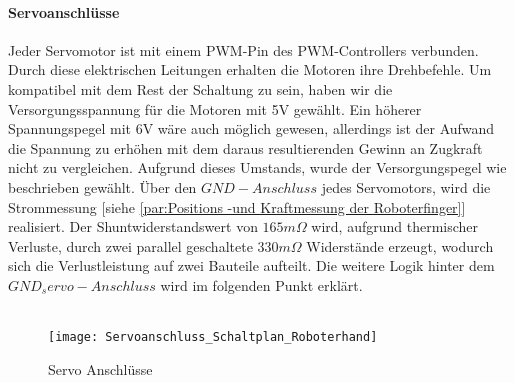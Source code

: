 \documentclass[titlepage,12pt,twoside]{article}
\begin{document}
\paragraph{Servoanschlüsse}
\hfill \break
\hfill \break
Jeder Servomotor ist mit einem PWM-Pin des PWM-Controllers verbunden. Durch diese elektrischen Leitungen erhalten die Motoren ihre Drehbefehle. Um kompatibel mit dem Rest der Schaltung zu sein, haben wir die Versorgungsspannung für die Motoren mit
5V gewählt. Ein höherer Spannungspegel mit 6V wäre auch möglich gewesen, allerdings ist der Aufwand die Spannung zu erhöhen mit dem daraus resultierenden Gewinn an Zugkraft nicht zu vergleichen. Aufgrund dieses Umstands, wurde der Versorgungspegel
wie beschrieben gewählt. Über den $GND-Anschluss$ jedes Servomotors, wird die Strommessung [siehe \textcolor{blue}{\autoref{par:Positions -und Kraftmessung der Roboterfinger}}] realisiert. Der Shuntwiderstandswert von $165m\Omega$ wird, aufgrund thermischer Verluste, durch zwei parallel geschaltete $330m\Omega$ 
Widerstände erzeugt, wodurch sich die Verlustleistung auf zwei Bauteile aufteilt. Die weitere Logik hinter dem $GND_servo-Anschluss$ wird im folgenden Punkt erklärt. \\
\\
\begin{figure}[H]
	\begin{center}
		\scalebox{0.6}
		{\texttt{[image: Servoanschluss\_Schaltplan\_Roboterhand]}}
		\caption{Servo Anschlüsse}
		\label{fig:Servoanschluss_Schaltplan_Roboterhand}		
	\end{center}
\end{figure}
\newpage
\end{document}
